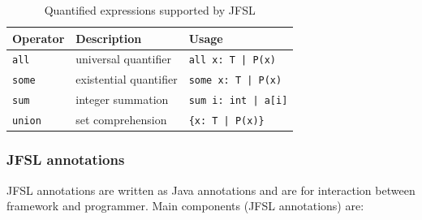 \documentclass[11pt,twoside,a4paper]{book}
\begin{document}
\begin{table}[ht]
  \centering
  
  \begin{tabular}{|l|l|l|}
  \hline
  \rowcolor[gray]{.8}    Operator  & Description  & Usage\\
  \hline
  \hline
  \verb|all| & universal quantifier & \verb#all x: T | P(x)#\\
  \hline
  \verb|some| & existential quantifier & \verb#some x: T | P(x)#\\ 
  \hline
  \verb|sum|  & integer summation & \verb#sum i: int | a[i]#\\ 
  \hline
  \verb|union| & set comprehension & \verb#{x: T | P(x)}#\\ 
  \hline
  
  \end{tabular}
  \caption{Quantified expressions supported by JFSL}
  \label{tab:quantifiedExpressions}
\end{table}
\newpage
\subsubsection{JFSL annotations}
JFSL annotations are written as Java annotations and are for interaction
between framework and programmer. Main components (JFSL annotations) are:
\end{document}
